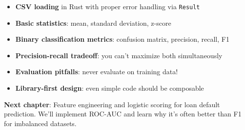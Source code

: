 \begin{itemize}
    \item \textbf{CSV loading} in Rust with proper error handling via \texttt{Result}
    \item \textbf{Basic statistics}: mean, standard deviation, z-score
    \item \textbf{Binary classification metrics}: confusion matrix, precision, recall, F1
    \item \textbf{Precision-recall tradeoff}: you can't maximize both simultaneously
    \item \textbf{Evaluation pitfalls}: never evaluate on training data!
    \item \textbf{Library-first design}: even simple code should be composable
\end{itemize}

\vspace{1em}
\noindent\textbf{Next chapter}: Feature engineering and logistic scoring for loan default prediction. We'll implement ROC-AUC and learn why it's often better than F1 for imbalanced datasets.
